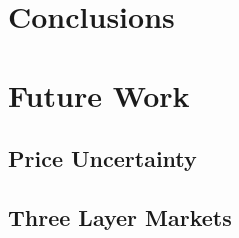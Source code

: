 \documentclass[11pt,twoside]{article}
\begin{document}
\section{Conclusions}
\section{Future Work}
\subsection{Price Uncertainty}
\subsection{Three Layer Markets}




\end{document}
